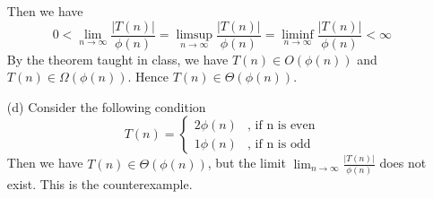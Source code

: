 \documentclass[12pt,a4paper]{article}
\begin{document}
\begin{enumerate}
\[        \]
        Then we have
        \[
            0 < \lim_{n\to\infty} \frac{\left\lvert T(n)\right\rvert }{\phi(n)} = \limsup_{n\to\infty} \frac{\left\lvert T(n)\right\rvert }{\phi(n)} = \liminf_{n\to\infty} \frac{\left\lvert T(n)\right\rvert }{\phi(n)} < \infty
        \]
        By the theorem taught in class, we have $T(n) \in O(\phi(n))$ and $T(n) \in \Omega (\phi(n))$.
        Hence $T(n) \in \Theta (\phi(n))$.
    \item[(d)]
        Consider the following condition
        \begin{equation}
            T(n) = \left\{
            \begin{aligned}
                2\phi(n) & \text{, if n is even} \\
                1\phi(n) & \text{, if n is odd}
            \end{aligned} 
            \right.
        \end{equation}
        Then we have $T(n) \in \Theta (\phi(n))$, but the limit $\lim_{n\to\infty} \frac{\left\lvert T(n)\right\rvert }{\phi(n)}$ does not exist.
        This is the counterexample.
\end{enumerate}
\end{document}
